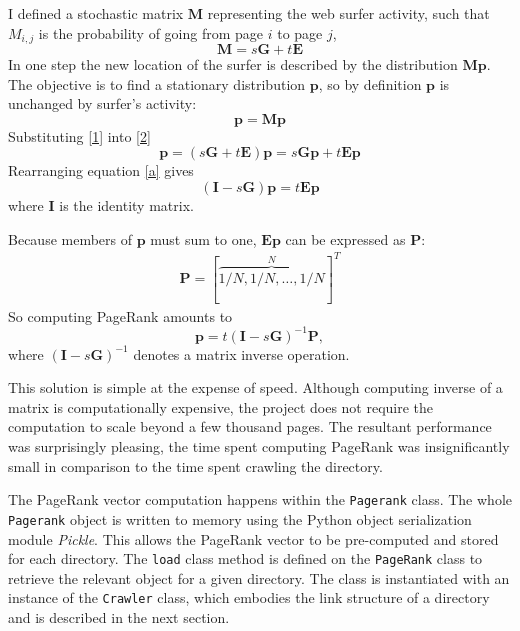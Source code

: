 \documentclass[12pt,notitlepage,twoside]{scrbook}
\begin{document}
I defined a stochastic matrix \(\bm{M}\) representing the web surfer activity, such
that \(M_{i,j}\) is the probability of going from page \(i\) to page \(j\), 
\begin{equation} \label{1}
	\bm{M} = s \bm{G} +t \bm{E}
\end{equation}
In one step the new location of the surfer is described by the distribution \(\bm{Mp}\).
The objective is to find a stationary distribution \(\bm{p}\), so by definition \(\bm{p}\) is unchanged by
surfer's activity:
\begin{equation}\label{2}
	\bm{p} = \bm{M}\bm{p}
\end{equation}
Substituting \ref{1} into \ref{2}
\begin{equation} \label{a}
	\bm{p} = (s\bm{G}+t\bm{E})\bm{p} = s\bm{G} \bm{p} + t\bm{E} \bm{p}
\end{equation}
Rearranging equation \ref{a} gives
\begin{equation}
	(\bm{I}-s\bm{G})\bm{p} = t\bm{E} \bm{p}
\end{equation}
where \(\bm{I}\) is the identity matrix.

Because members of \(\bm{p}\) must sum to one, \(\bm{E} \bm{p}\) can be expressed as \(\bm{P}\):
\begin{gather*}
	\bm{P} = [\overbrace{1/N,1/N,\dots,1/N}^N]^T
\end{gather*}
So computing PageRank amounts to
\begin{equation}
	\bm{p}  = t(\bm{I}-s\bm{G})^{-1}\bm{P},
\end{equation}
where \((\bm{I}-s\bm{G})^{-1}\) denotes a matrix inverse operation.

This solution is simple at the expense of speed. Although computing inverse of a matrix is
computationally expensive, the project does not require the computation to scale beyond a
few thousand pages. The resultant performance was surprisingly pleasing, the time
spent computing PageRank was insignificantly small in comparison to the time spent
crawling the directory.

The PageRank vector computation happens within the \texttt{Pagerank} class. The
whole \texttt{Pagerank} object is written to memory using the Python object
serialization module \textit{Pickle}. This allows the PageRank vector to be pre-computed
and stored for each directory. The \texttt{load} class method is defined
on the \texttt{PageRank} class to retrieve the relevant object for a given
directory. The class is instantiated with an instance of the \texttt{Crawler}
class, which embodies the link structure of a directory and is described in the
next section.
\end{document}
